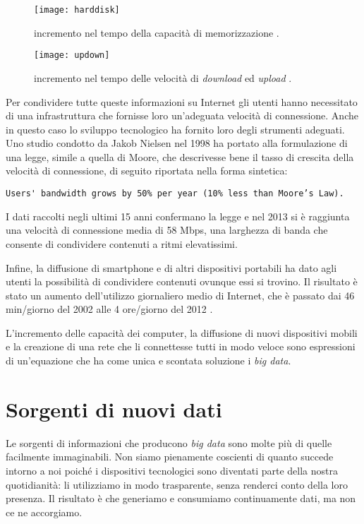 \begin{figure}[ht]
\centering
\texttt{[image: harddisk]}
\caption{incremento nel tempo della capacità di memorizzazione \cite{URL:storagegrowth}.}
\end{figure}

\begin{figure}[ht]
\centering
\texttt{[image: updown]}
\caption{incremento nel tempo delle velocità di \textit{download} ed \textit{upload} \cite{URL:storagegrowth}.}
\end{figure}

Per condividere tutte queste informazioni su Internet gli utenti hanno necessitato di una infrastruttura che fornisse loro un’adeguata velocità di connessione. Anche in questo caso 
lo sviluppo tecnologico ha fornito loro degli strumenti adeguati. Uno studio condotto da Jakob Nielsen nel 1998 \cite{URL:nielsenlaw} ha portato alla 
formulazione di una legge, simile a quella di Moore, che descrivesse bene il tasso di crescita della velocità di connessione, di seguito riportata nella forma sintetica:

\begin{lstlisting}[breaklines]
Users' bandwidth grows by 50% per year (10% less than Moore’s Law).
\end{lstlisting}

I dati raccolti negli ultimi 15 anni confermano la legge e nel 2013 si è raggiunta una velocità di connessione media di 58 Mbps, una larghezza di banda che consente di condividere
contenuti a ritmi elevatissimi.

Infine, la diffusione di smartphone e di altri dispositivi portabili ha dato agli utenti la possibilità di condividere contenuti ovunque essi si trovino. Il risultato è stato un 
aumento dell’utilizzo giornaliero medio di Internet, che è passato dai 46 min/giorno del 2002 alle 4 ore/giorno del 2012 \cite{URL:increaseusage}.

L’incremento delle capacità dei computer, la diffusione di nuovi dispositivi mobili e la creazione di una rete che li connettesse tutti in modo veloce sono espressioni di un’equazione 
che ha come unica e scontata soluzione i \textit{big data}.


\section{Sorgenti di nuovi dati}

Le sorgenti di informazioni che producono \textit{big data} sono molte più di quelle facilmente immaginabili. Non siamo pienamente coscienti di quanto succede intorno a noi poiché i dispositivi 
tecnologici sono diventati parte della nostra quotidianità: li utilizziamo in modo trasparente, senza renderci conto della loro presenza. Il risultato è che generiamo e consumiamo 
continuamente dati, ma non ce ne accorgiamo.

